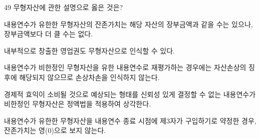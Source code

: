 \begin{question}{49}
무형자산에 관한 설명으로 옳은 것은?
\begin{choices}
  \item 내용연수가 유한한 무형자산의 잔존가치는 해당 자산의 장부금액과 같을 수는 있으나, 장부금액보다 더 클 수는 없다.
  \item 내부적으로 창출한 영업권도 무형자산으로 인식할 수 있다.
  \item 내용연수가 비한정인 무형자산을 유한 내용연수로 재평가하는 경우에는 자산손상의 징후에 해당되지 않으므로 손상차손을 인식하지 않는다.
  \item 경제적 효익이 소비될 것으로 예상되는 형태를 신뢰성 있게 결정할 수 없는 내용연수가 비한정인 무형자산은 정액법을 적용하여 상각한다.
  \item 내용연수가 유한한 무형자산을 내용연수 종료 시점에 제3자가 구입하기로 약정한 경우, 잔존가치는 영(0)으로 보지 않는다.
\end{choices}
\end{question}
